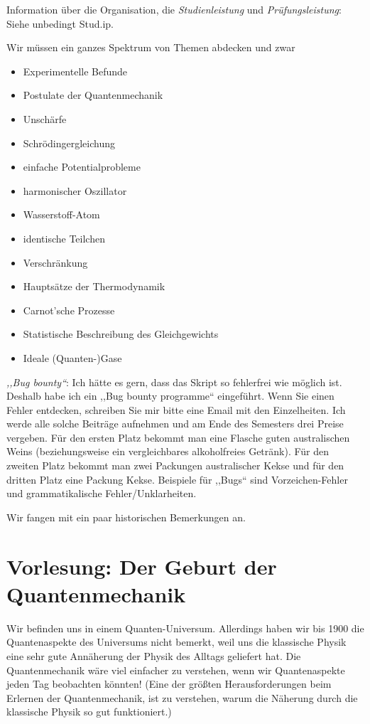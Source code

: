 

Information über die Organisation, die \emph{Studienleistung} und \emph{Prüfungsleistung}: Siehe unbedingt Stud.ip.

Wir müssen ein ganzes Spektrum von Themen abdecken und zwar
\begin{itemize}
\item Experimentelle Befunde
\item Postulate der Quantenmechanik
\item Unschärfe
\item Schrödingergleichung
\item einfache Potentialprobleme
\item harmonischer Oszillator
\item Wasserstoff-Atom
\item identische Teilchen
\item Verschränkung
\item Hauptsätze der Thermodynamik
\item Carnot'sche Prozesse
\item Statistische Beschreibung des Gleichgewichts
\item Ideale (Quanten-)Gase
\end{itemize}

\emph{,,Bug bounty``}: Ich hätte es gern, dass das Skript so fehlerfrei wie möglich ist. Deshalb habe ich ein ,,Bug bounty programme`` eingeführt. Wenn Sie einen Fehler entdecken, schreiben Sie mir bitte eine Email mit den Einzelheiten. Ich werde alle solche Beiträge aufnehmen und am Ende des Semesters drei Preise vergeben. Für den ersten Platz bekommt man eine Flasche guten australischen Weins (beziehungsweise ein vergleichbares alkoholfreies Getränk). Für den zweiten Platz bekommt man zwei Packungen australischer Kekse und für den dritten Platz eine Packung Kekse. Beispiele für ,,Bugs`` sind Vorzeichen-Fehler und grammatikalische Fehler/Unklarheiten.

Wir fangen mit ein paar historischen Bemerkungen an. 

\section{Vorlesung: Der Geburt der Quantenmechanik}
Wir befinden uns in einem Quanten-Universum. Allerdings haben wir bis 1900 die Quantenaspekte des Universums nicht bemerkt, weil uns die klassische Physik eine sehr gute Annäherung der Physik des Alltags geliefert hat. Die Quantenmechanik wäre viel einfacher zu verstehen, wenn wir Quantenaspekte jeden Tag beobachten könnten! (Eine der größten Herausforderungen beim Erlernen der Quantenmechanik, ist zu verstehen, warum die Näherung durch die klassische Physik so gut funktioniert.)

